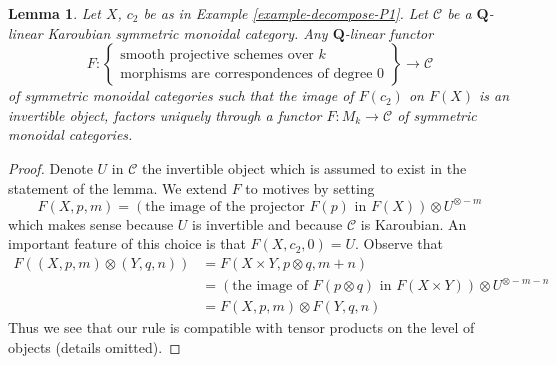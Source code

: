 \documentclass{stacks-project}
\theoremstyle{plain}
\newtheorem{lemma}[subsection]{Lemma}
\theoremstyle{definition}
\theoremstyle{remark}
\numberwithin{equation}{subsection}
\begin{document}
\begin{lemma}
\label{lemma-characterize-motives}
Let $X$, $c_2$ be as in Example \ref{example-decompose-P1}.
Let $\mathcal{C}$ be a $\mathbf{Q}$-linear Karoubian symmetric
monoidal category. Any $\mathbf{Q}$-linear functor
$$
F :
\left\{
\begin{matrix}
\text{smooth projective schemes over }k\\
\text{morphisms are correspondences of degree }0
\end{matrix}
\right\}
\longrightarrow
\mathcal{C}
$$
of symmetric monoidal categories such that the image of $F(c_2)$ on
$F(X)$ is an invertible object, factors uniquely through a functor
$F : M_k \to \mathcal{C}$ of symmetric monoidal categories.
\end{lemma}

\begin{proof}
Denote $U$ in $\mathcal{C}$ the invertible object which is assumed to exist
in the statement of the lemma. We extend $F$ to motives by setting
$$
F(X, p, m) = \left(\text{the image of
the projector }F(p)\text{ in }F(X)\right) \otimes U^{\otimes -m}
$$
which makes sense because $U$ is invertible and because $\mathcal{C}$
is Karoubian. An important feature of this choice is that
$F(X, c_2, 0) = U$. Observe that
\begin{align*}
F((X, p, m) \otimes (Y, q, n))
& =
F(X \times Y, p \otimes q, m + n) \\
& =
\left(\text{the image of }F(p \otimes q)\text{ in }F(X \times Y)\right)
\otimes U^{\otimes -m - n} \\
& =
F(X, p, m) \otimes F(Y, q, n)
\end{align*}
Thus we see that our rule is compatible with tensor products on
the level of objects (details omitted).


\end{proof}
\end{document}
